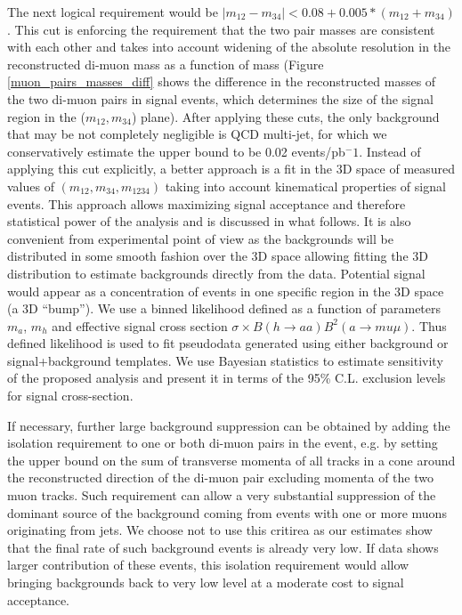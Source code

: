 \documentclass[aps,prl,twocolumn,nofootinbib,superscriptaddress]{revtex4}
\begin{document}
The next logical requirement would be $|m_{12}-m_{34}|<0.08+0.005*(m_{12}+m_{34})$.  This cut is
enforcing the requirement that the two pair masses are consistent with each other and 
takes into account widening of the absolute resolution in the reconstructed di-muon
mass as a function of mass (Figure \ref{muon_pairs_masses_diff} shows the difference in the 
reconstructed masses of the two di-muon pairs in signal events, which determines the
size of the signal region  in the ($m_{12}, m_{34}$) plane). After applying these cuts, 
the only background that may be not completely negligible is QCD multi-jet, for which we 
conservatively estimate the upper bound to be 0.02 events/pb$^-1$. Instead of applying this 
cut explicitly, a better approach is a fit in the 3D space of 
measured values of $(m_{12},m_{34}, m_{1234})$ taking into account
kinematical properties of  signal events. This approach allows maximizing signal
acceptance and therefore statistical power of the analysis and is discussed in what
follows. It is also convenient from experimental point of view as the backgrounds
will  be distributed in some smooth fashion over the 3D space allowing fitting the 3D
distribution to estimate  backgrounds directly from the data. Potential signal would
appear as a concentration of events in one specific  region in the 3D space (a 3D
``bump''). We use a binned likelihood defined as a function of parameters $m_a$, 
$m_h$ and effective signal cross section $\sigma \times B (h \to aa) B^2(a \to mu \mu)$. 
Thus defined likelihood is used to fit pseudodata generated using either background or 
signal+background templates. We use Bayesian statistics to estimate sensitivity of the 
proposed analysis and present it in terms of the 95\% C.L. exclusion levels for signal 
cross-section.

If necessary, further large background suppression can be obtained by adding the isolation requirement 
to one or both di-muon pairs in the event, e.g. by setting the upper bound on the sum of transverse momenta 
of all tracks in a cone around the reconstructed direction of the di-muon pair excluding momenta of the 
two muon tracks. Such requirement can allow a very substantial suppression of the dominant source of the background coming from events with one or more 
muons originating from jets. We choose not to use this critirea as our estimates show that the final rate 
of such background events is already very low. If data shows larger contribution of these events, 
this isolation requirement would allow bringing backgrounds back to very low level at a moderate
cost to signal acceptance.
\end{document}
